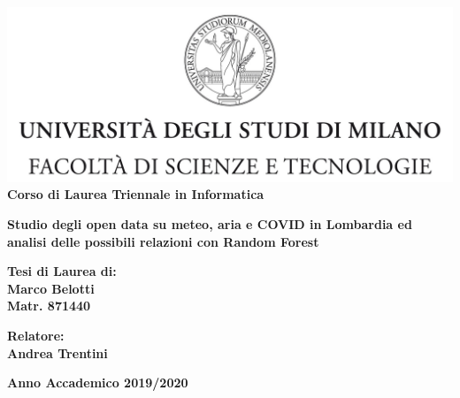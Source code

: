 \documentclass[a4paper]{report}
\begin{document}
\begin{titlepage}
\begin{center}
\includegraphics[width=\textwidth]{Logo.jpg}\\
{\large{\bf Corso di Laurea Triennale in Informatica}}
\end{center}
\vspace{12mm}
\begin{center}
{\huge{\bf Studio degli open data su meteo, aria e COVID in Lombardia ed analisi delle possibili relazioni con Random Forest}}\\
\end{center}
\vspace{12mm}
\begin{flushright}
{\large{\bf Tesi di Laurea di:}}\\
{\large{\bf Marco Belotti}}\\
{\large{\bf Matr. 871440}}\\
\end{flushright}
\vspace{4mm}
\begin{flushleft}
{\large{\bf Relatore:}}\\
{\large{\bf Andrea Trentini}}\\
\vspace{4mm}
\end{flushleft}
\vspace{12mm}
\begin{center}
{\large{\bf Anno Accademico 2019/2020}}
\end{center}
\end{titlepage}

\listoftodos
\end{document}

